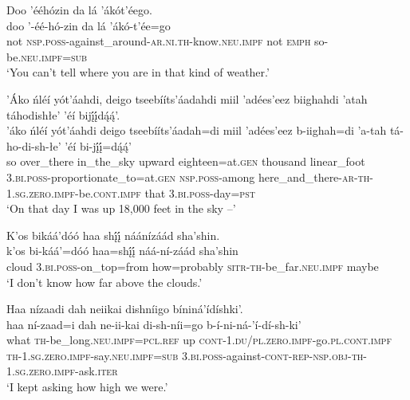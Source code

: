 \ea\label{ex:text9-4-5}
Doo ’ééhózin da lá ’ákót’éego.\\
\gll doo	’-éé-hó-zin	da	lá	’ákó-t’ée=go\\
     not	\textsc{nsp}.\textsc{poss}-against\_around-\textsc{ar}.\textsc{ni}.\textsc{th}-know.\textsc{neu}.\textsc{impf}	not	\textsc{emph}	so-be.\textsc{neu}.\textsc{impf}=\textsc{sub}\\
\glt `You can't tell where you are in that kind of weather.'
\z

\ea\label{ex:text9-4-6}
’Áko ńléí yót’áahdi, deigo tseebííts’áadahdi miil ’adées’eez biighahdi ’atah táhodishłe’ ’éí bijį́į́dą́ą́’.\\
\gll ’áko	ńléí	yót’áahdi	deigo	tseebííts’áadah=di	miil	’adées’eez	b-iighah=di	’a-tah	tá-ho-di-sh-łe’	’éí	bi-jį́į́=dą́ą́’\\
     so	over\_there	in\_the\_sky	upward	eighteen=at.\textsc{gen}	thousand	linear\_foot	3.\textsc{bi}.\textsc{poss}-proportionate\_to=at.\textsc{gen}	\textsc{nsp}.\textsc{poss}-among	here\_and\_there-\textsc{ar}-\textsc{th}-1.\textsc{sg}.\textsc{zero}.\textsc{impf}-be.\textsc{cont}.\textsc{impf}	that	3.\textsc{bi}.\textsc{poss}-day=\textsc{pst}\\
\glt `On that day I was up 18,000 feet in the sky --'
\z

\ea\label{ex:text9-4-7}
K’os bikáá’dóó haa shį́į́ náánízáád sha’shin.\\
\gll k’os	bi-káá’=dóó	haa=shį́į́	náá-ní-záád	sha’shin\\
     cloud	3.\textsc{bi}.\textsc{poss}-on\_top=from	how=probably	\textsc{sitr}-\textsc{th}-be\_far.\textsc{neu}.\textsc{impf}	maybe\\
\glt `I don't know how far above the clouds.'
\z

\ea\label{ex:text9-4-8}
Haa nízaadi dah neiikai dishníigo bíniná’ídíshki’.\\
\gll haa	ní-zaad=i	dah	ne-ii-kai	di-sh-níi=go	b-í-ni-ná-’í-dí-sh-ki’\\
     what	\textsc{th}-be\_long.\textsc{neu}.\textsc{impf}=\textsc{pcl}.\textsc{ref}	up	\textsc{cont}-1.\textsc{du}/\textsc{pl}.\textsc{zero}.\textsc{impf}-go.\textsc{pl}.\textsc{cont}.\textsc{impf}	\textsc{th}-1.\textsc{sg}.\textsc{zero}.\textsc{impf}-say.\textsc{neu}.\textsc{impf}=\textsc{sub}	3.\textsc{bi}.\textsc{poss}-against-\textsc{cont}-\textsc{rep}-\textsc{nsp}.\textsc{obj}-\textsc{th}-1.\textsc{sg}.\textsc{zero}.\textsc{impf}-ask.\textsc{iter}\\
\glt `I kept asking how high we were.'
\z

